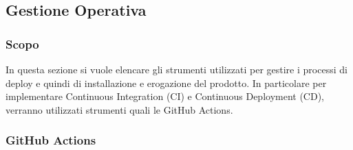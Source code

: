 \subsection{Gestione Operativa}
\subsubsection{Scopo}
In questa sezione si vuole elencare gli strumenti utilizzati per gestire i processi di deploy e quindi di installazione e erogazione del prodotto. In particolare per implementare Continuous Integration (CI) e Continuous Deployment (CD), verranno utilizzati strumenti quali le GitHub Actions.
\subsubsection{GitHub Actions}
